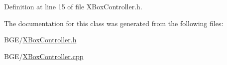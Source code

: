 Definition at line 15 of file X\-Box\-Controller.\-h.



The documentation for this class was generated from the following files\-:\begin{DoxyCompactItemize}
\item 
B\-G\-E/\hyperlink{_x_box_controller_8h}{X\-Box\-Controller.\-h}\item 
B\-G\-E/\hyperlink{_x_box_controller_8cpp}{X\-Box\-Controller.\-cpp}\end{DoxyCompactItemize}
